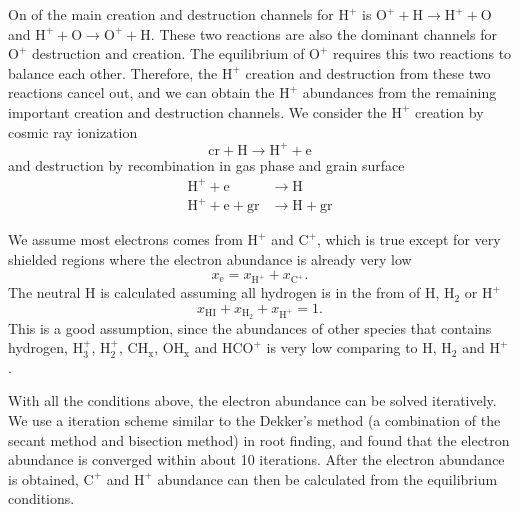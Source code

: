\documentclass[iop,numberedappendix]{emulateapj}
\newcommand{\e}{\mathrm{e}}
\newcommand{\mr}{\mathrm}
\newcommand{\Ht}{\mathrm{H_2}}
\newcommand{\Ho}{\mathrm{H}}
\newcommand{\HI}{\mathrm{HI}}
\newcommand{\Hplus}{\mathrm{H^+}}
\newcommand{\Cplus}{\mathrm{C^+}}
\newcommand{\CHx}{\mathrm{CH_x}}
\newcommand{\OHx}{\mathrm{OH_x}}
\newcommand{\Oplus}{\mathrm{O^+}}
\begin{document}
On of the main creation and destruction channels for $\Hplus$ is 
$\mr{O^+ + H \rightarrow H^+ + O}$ and $\mr{H^+ + O \rightarrow O^+ + H}$. 
These two reactions are also the dominant channels for $\Oplus$ destruction and
creation. The equilibrium of $\Oplus$ requires this two reactions to balance
each other. Therefore, the $\Hplus$ creation and destruction from these two
reactions cancel out, and we can obtain the $\Hplus$ abundances from the
remaining important creation and destruction channels. We consider the $\Hplus$
creation by cosmic ray ionization
\begin{equation*}
    \mr{cr + H\rightarrow H^+ + e}
\end{equation*}
and destruction by recombination in gas phase and grain surface
\begin{align*}
    \mr{H^+ + e}&\mr{\rightarrow H}\\
    \mr{H^+ + e + gr}&\mr{\rightarrow H + gr}
\end{align*}

We assume most electrons comes from $\Hplus$ and $\Cplus$, which is true except
for very shielded regions where the electron abundance is already very low
\begin{equation*}
    x_\e = x_\Hplus + x_\Cplus.
\end{equation*}
The neutral $\Ho$ is calculated assuming all hydrogen is in the from of $\Ho$,
$\Ht$ or $\Hplus$
\begin{equation*}
    x_\HI + x_\Ht + x_\Hplus = 1.
\end{equation*}
This is a good assumption, since the abundances of other species that contains
hydrogen, $\mr{H_3^+}$, $\mr{H_2^+}$, $\CHx$, $\OHx$ and $\mr{HCO^+}$ is very
low comparing to $\Ho$, $\Ht$ and $\Hplus$.

With all the conditions above, the electron abundance can be solved
iteratively. We use a iteration scheme similar to the Dekker's method
(a combination of the secant method and bisection method) in root finding, 
and found that the electron abundance
is converged within about 10 iterations. After the electron abundance is
obtained, $\Cplus$ and $\Hplus$ abundance can then be calculated from the
equilibrium conditions.
\end{document}
